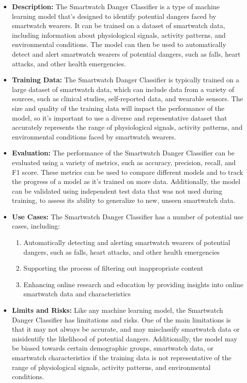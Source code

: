 \begin{itemize}
\begin{itemize}
    \item \textbf{Description:} The Smartwatch Danger Classifier is a type of machine learning model that's designed to identify potential dangers faced by smartwatch wearers. It can be trained on a dataset of smartwatch data, including information about physiological signals, activity patterns, and environmental conditions. The model can then be used to automatically detect and alert smartwatch wearers of potential dangers, such as falls, heart attacks, and other health emergencies.
    \item \textbf{Training Data:} The Smartwatch Danger Classifier is typically trained on a large dataset of smartwatch data, which can include data from a variety of sources, such as clinical studies, self-reported data, and wearable sensors. The size and quality of the training data will impact the performance of the model, so it's important to use a diverse and representative dataset that accurately represents the range of physiological signals, activity patterns, and environmental conditions faced by smartwatch wearers.
    \item \textbf{Evaluation:} The performance of the Smartwatch Danger Classifier can be evaluated using a variety of metrics, such as accuracy, precision, recall, and F1 score. These metrics can be used to compare different models and to track the progress of a model as it's trained on more data. Additionally, the model can be validated using independent test data that was not used during training, to assess its ability to generalize to new, unseen smartwatch data.
    \item \textbf{Use Cases:} The Smartwatch Danger Classifier has a number of potential use cases, including:
        \begin{enumerate}  
            \item Automatically detecting and alerting smartwatch wearers of potential dangers, such as falls, heart attacks, and other health emergencies
            \item Supporting the process of filtering out inappropriate content
            \item Enhancing online research and education by providing insights into online smartwatch data and characteristics
        \end{enumerate}
    \item \textbf{Limits and Risks:} Like any machine learning model, the Smartwatch Danger Classifier has limitations and risks. One of the main limitations is that it may not always be accurate, and may misclassify smartwatch data or misidentify the likelihood of potential dangers. Additionally, the model may be biased towards certain demographic groups, smartwatch data, or smartwatch characteristics if the training data is not representative of the range of physiological signals, activity patterns, and environmental conditions.

\end{itemize}
\end{itemize}
